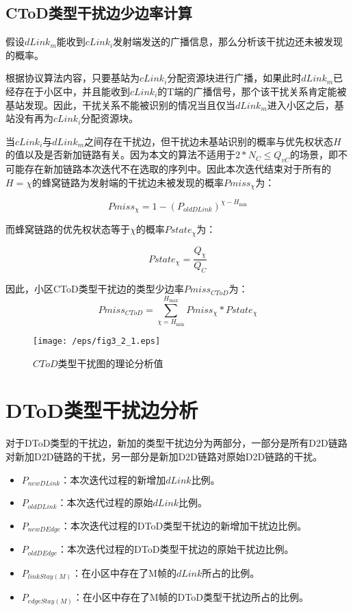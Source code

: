 \documentclass[figurelist,tablelist,algorithmlist,nomlist,masters]{seuthesix}
\begin{document}
	
	\subsection{CToD类型干扰边少边率计算}
	假设$dLink_m$能收到$cLink_i$发射端发送的广播信息，那么分析该干扰边还未被发现的概率。
	
	根据协议算法内容，只要基站为$cLink_i$分配资源块进行广播，如果此时$dLink_m$已经存在于小区中，并且能收到$cLink_i$的T端的广播信号，那个该干扰关系肯定能被基站发现。因此，干扰关系不能被识别的情况当且仅当$dLink_m$进入小区之后，基站没有再为$cLink_i$分配资源块。
	
	当$cLink_i$与$dLink_m$之间存在干扰边，但干扰边未基站识别的概率与优先权状态$H$的值以及是否新加链路有关。因为本文的算法不适用于$2*N_C \le Q_{vC}$的场景，即不可能存在新加链路本次迭代不在选取的序列中。因此本次迭代结束对于所有的$H = \chi $的蜂窝链路为发射端的干扰边未被发现的概率$Pmiss_{\chi }$为：
	
	\begin{equation}\label{eq3.1}
	Pmiss_{\chi } = 1 - {({P_{oldDLink}})^{\chi - H_{\min }}}
	\end{equation}
	
	而蜂窝链路的优先权状态等于$\chi $的概率$Pstate_{\chi }$为：
	
	\begin{equation}\label{eq3.1}
	Pstate_{\chi } = \frac{{Q_{\chi }}}{{Q_C}}
	\end{equation}
	
	因此，小区CToD类型干扰边的类型少边率$Pmiss_{CToD}$为：
	\begin{equation}\label{eq3.1}
	Pmiss_{CToD} = \sum\limits_{\chi = {H_{\min }}}^{{H_{\max }}} Pmiss_{\chi }*Pstate_{\chi }
	\end{equation}
	
	\begin{figure}[!h]
		\centering
		\texttt{[image: /eps/fig3\_2\_1.eps]}
		\caption{$CToD$类型干扰图的理论分析值}
		\label{fig3_2_1}
	\end{figure}
	
	
	\section{DToD类型干扰边分析}
	对于DToD类型的干扰边，新加的类型干扰边分为两部分，一部分是所有D2D链路对新加D2D链路的干扰，另一部分是新加D2D链路对原始D2D链路的干扰。
	\begin{itemize}
		\item ${P_{newDLink}}$：本次迭代过程的新增加$dLink$比例。
		\item ${P_{oldDLink}}$：本次迭代过程的原始$dLink$比例。
		\item ${P_{newDEdge}}$：本次迭代过程的DToD类型干扰边的新增加干扰边比例。
		\item ${P_{oldDEdge}}$：本次迭代过程的DToD类型干扰边的原始干扰边比例。
		\item ${P_{linkStay(M)}}$：在小区中存在了M帧的$dLink$所占的比例。
		\item ${P_{edgeStay(M)}}$：在小区中存在了M帧的DToD类型干扰边所占的比例。
	\end{itemize}
	
\end{document}
